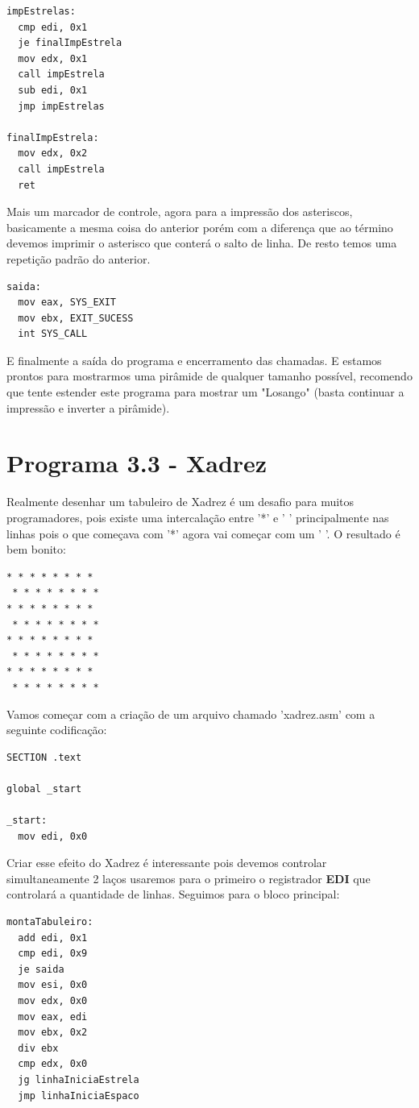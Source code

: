 \begin{lstlisting}[]
impEstrelas:
  cmp edi, 0x1
  je finalImpEstrela
  mov edx, 0x1
  call impEstrela
  sub edi, 0x1
  jmp impEstrelas

finalImpEstrela:
  mov edx, 0x2
  call impEstrela
  ret  	
\end{lstlisting}

Mais um marcador de controle, agora para a impressão dos asteriscos, basicamente a mesma coisa do anterior porém com a diferença que ao término devemos imprimir o asterisco que conterá o salto de linha. De resto temos uma repetição padrão do anterior.

\begin{lstlisting}[]
saida:
  mov eax, SYS_EXIT
  mov ebx, EXIT_SUCESS
  int SYS_CALL	
\end{lstlisting}

E finalmente a saída do programa e encerramento das chamadas. E estamos prontos para mostrarmos uma pirâmide de qualquer tamanho possível, recomendo que tente estender este programa para mostrar um "Losango" (basta continuar a impressão e inverter a pirâmide). 

\section{Programa 3.3 - Xadrez}
Realmente desenhar um tabuleiro de Xadrez é um desafio para muitos programadores, pois existe uma intercalação entre '*' e ' ' principalmente nas linhas pois o que começava com '*' agora vai começar com um ' '. O resultado é bem bonito:
\begin{lstlisting}[]
* * * * * * * *
 * * * * * * * * 
* * * * * * * *
 * * * * * * * * 
* * * * * * * *
 * * * * * * * * 
* * * * * * * *
 * * * * * * * * 
\end{lstlisting}

Vamos começar com a criação de um arquivo chamado 'xadrez.asm' com a seguinte codificação:
\begin{lstlisting}[]
SECTION .text

global _start

_start:
  mov edi, 0x0
\end{lstlisting}

Criar esse efeito do Xadrez é interessante pois devemos controlar simultaneamente 2 laços usaremos para o primeiro o registrador \textbf{EDI} que controlará a quantidade de linhas. Seguimos para o bloco principal:
\begin{lstlisting}[]
montaTabuleiro:
  add edi, 0x1
  cmp edi, 0x9
  je saida
  mov esi, 0x0
  mov edx, 0x0
  mov eax, edi
  mov ebx, 0x2
  div ebx
  cmp edx, 0x0
  jg linhaIniciaEstrela 
  jmp linhaIniciaEspaco	
\end{lstlisting}

